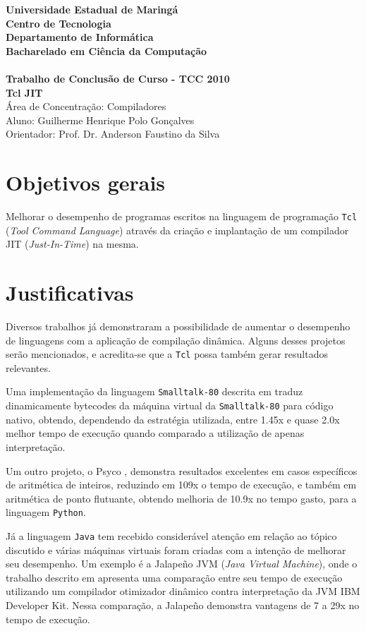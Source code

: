 \documentclass[12pt]{article}
\newcommand{\instituicao}{Universidade Estadual de Maringá \\
Centro de Tecnologia \\
Departamento de Informática \\
Bacharelado em Ciência da Computação \\
\hfill}
\newcommand{\titulo}{
Trabalho de Conclusão de Curso - TCC 2010\\ [5cm]
Tcl JIT}
\newcommand{\areaconcentracao}{Compiladores}
\newcommand{\autor}{Guilherme Henrique Polo Gonçalves}
\newcommand{\orientador}{Prof. Dr. Anderson Faustino da Silva}
\newcommand*{\textbfsf}[1]{\textbf{\textsf{#1}}}
\begin{document}
\begin{titlepage}
  \vfill
  \begin{center}
  {\Large \textbfsf \instituicao} \\
  {\large \textbfsf \titulo}\\[5cm]
  Área de Concentração: \areaconcentracao \\
  Aluno: \autor\\ %
  Orientador: \orientador\\ %
  \vfill
  \end{center}
\end{titlepage}


\section{Objetivos gerais}
Melhorar o desempenho de programas escritos na linguagem de
programação \texttt{Tcl}
(\emph{Tool Command Language}) através da criação e implantação de um
compilador JIT (\textit{Just-In-Time}) na mesma.


\section{Justificativas}
Diversos trabalhos já demonstraram a possibilidade de aumentar o
desempenho de linguagens com a aplicação de compilação
dinâmica. Alguns desses projetos serão mencionados, e acredita-se que a
\texttt{Tcl} possa também gerar resultados relevantes.

Uma implementação da linguagem \texttt{Smalltalk-80} descrita em
\cite{deutsch84efficient} traduz dinamicamente bytecodes da máquina
virtual da \texttt{Smalltalk-80} para código nativo, obtendo,
dependendo da estratégia utilizada, entre 1.45x e quase 2.0x
melhor tempo de execução quando comparado a utilização de apenas
interpretação.

Um outro projeto, o Psyco \cite{psyco}, demonstra resultados
excelentes em casos específicos de aritmética de inteiros, reduzindo
em 109x o tempo de execução, e também em aritmética de
ponto flutuante, obtendo melhoria de 10.9x no tempo gasto, para a linguagem
 \texttt{Python}.

Já a linguagem \texttt{Java} tem recebido considerável atenção
em relação ao tópico discutido e várias máquinas virtuais foram
criadas com a intenção de melhorar seu desempenho. Um exemplo é a Jalapeño JVM
(\textit{Java Virtual Machine}), onde o trabalho descrito em
\cite{jalapeno_1} apresenta uma comparação entre seu tempo de execução
utilizando um compilador otimizador dinâmico contra
interpretação da JVM IBM Developer Kit. Nessa comparação, a Jalapeño
demonstra vantagens de 7 a 29x no tempo de execução.
\end{document}

